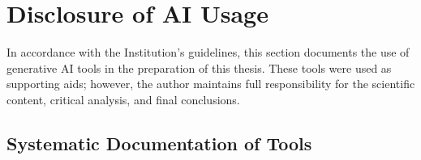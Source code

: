 \chapter*{Disclosure of AI Usage}

In accordance with the Institution's guidelines, this section documents the use of generative AI tools in the preparation of this thesis. These tools were used as supporting aids; however, the author maintains full responsibility for the scientific content, critical analysis, and final conclusions.

\section*{Systematic Documentation of Tools}

